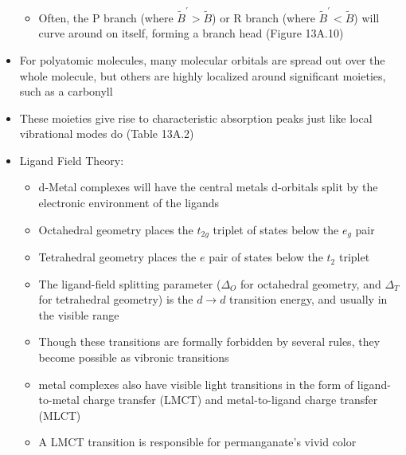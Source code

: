\documentclass[12pt, openany, letterpaper]{memoir}
\begin{document}
\begin{itemize}
\begin{itemize}
		\item Often, the P branch (where $\tilde{B}^\prime>\tilde{B}$) or R branch (where $\tilde{B}^\prime < \tilde{B}$) will curve around on itself, forming a branch  head (Figure 13A.10)
	\end{itemize}
	\item For polyatomic molecules, many molecular orbitals are spread out over the whole molecule, but others are highly localized around significant moieties, such as a carbonyll
	\item These moieties give rise to characteristic absorption peaks just like local vibrational modes do (Table 13A.2)
	\item Ligand Field Theory:
	\begin{itemize}
		\item d-Metal complexes will have the central metals d-orbitals split by the electronic environment of the ligands		
		\item Octahedral geometry places the $t_{2g}$ triplet of states below the $e_g$ pair
		\item Tetrahedral geometry places the $e$ pair of states below the $t_2$ triplet
		\item The ligand-field splitting parameter ($\Delta_O$ for octahedral geometry, and $\Delta_T$ for tetrahedral geometry) is the $d\rightarrow d$ transition energy, and usually in the visible range
		\item Though these transitions are formally forbidden by several rules, they become possible as vibronic transitions
		\item metal complexes also have visible light transitions in the form of ligand-to-metal charge transfer (LMCT) and metal-to-ligand charge transfer (MLCT)
		\item A LMCT transition is responsible for permanganate's vivid color
	\end{itemize}
\end{itemize}
\end{document}

